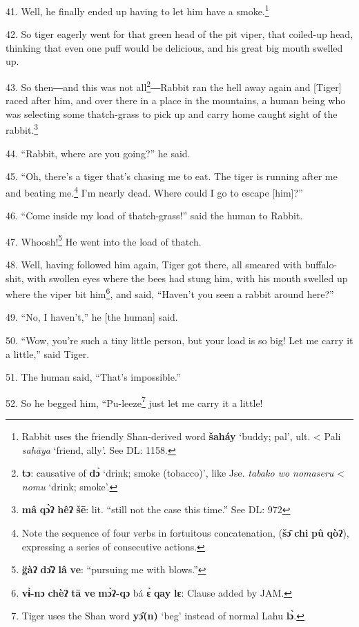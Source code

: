 41. Well, he finally ended up having to let him have a smoke.\footnote{Rabbit uses the friendly Shan-derived word \textbf{šaháy} `buddy; pal', ult. < Pali \textit{sahāya }`friend, ally'. See DL: 1158.}

42. So tiger eagerly went for that green head of the pit viper, that coiled-up
head, thinking that even one puff would be delicious, and his great big mouth swelled up.

43. So then―and this was not all\footnote{\textbf{tɔ}: causative of \textbf{dɔ̀} `drink; smoke (tobacco)', like Jse. \textit{tabako wo nomaseru }< \textit{nomu} `drink; smoke'.}―Rabbit ran the hell away again and [Tiger]
raced after him, and over there in a place in the mountains, a human being who was selecting some thatch-grass to pick up and carry home caught sight
of the rabbit.\footnote{\textbf{mâ} \textbf{qɔ̀ʔ} \textbf{hêʔ} \textbf{šē}: lit. ``still not the case this time.'' See DL: 972}

44. ``Rabbit, where are you going?'' he said.

45. ``Oh, there's a tiger that's chasing me to eat. The tiger is running after
me and beating me.\footnote{Note the sequence of four verbs in fortuitous concatenation, (\textbf{šɔ̄} \textbf{chi} \textbf{pû} \textbf{qòʔ}), expressing a series of consecutive actions.} I'm nearly dead. Where could I go to escape [him]?''

46. ``Come inside my load of thatch-grass!'' said the human to Rabbit.

47. Whoosh!\footnote{\textbf{g̈àʔ} \textbf{dɔ̂ʔ} \textbf{lâ} \textbf{ve}: ``pursuing me with blows.''} He went into the load of thatch.

48. Well, having followed him again, Tiger got there, all smeared with buffalo-shit,
with swollen eyes where the bees had stung him, with his mouth swelled up where
the viper bit him\footnote{\textbf{vɨ̀-nɔ} \textbf{chèʔ} \textbf{tā} \textbf{ve} \textbf{mɔ̀ʔ-qɔ} bá \textbf{ɛ̀} \textbf{qay} \textbf{lɛ}: Clause added by JAM.}, and said, ``Haven't you seen a rabbit around here?''

49. ``No, I haven't,'' he [the human] said.

50. ``Wow, you're such a tiny little person, but your load is so big! Let me carry
it a little,'' said Tiger.

51. The human said, ``That's impossible.''

52. So he begged him, ``Pu-leeze\footnote{Tiger uses the Shan word \textbf{yɔ̂(n)} `beg' instead of normal Lahu \textbf{lɔ̀}.} just let me carry it a little!


